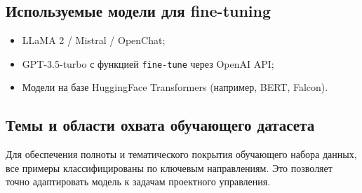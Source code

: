 \documentclass[12pt]{article}
\begin{document}
\subsection{Используемые модели для fine-tuning}

\begin{itemize}
    \item LLaMA 2 / Mistral / OpenChat;
    \item GPT-3.5-turbo с функцией \texttt{fine-tune} через OpenAI API;
    \item Модели на базе HuggingFace Transformers (например, BERT, Falcon).
\end{itemize}
\subsection{Темы и области охвата обучающего датасета}

Для обеспечения полноты и тематического покрытия обучающего набора данных, все примеры классифицированы по ключевым направлениям. Это позволяет точно адаптировать модель к задачам проектного управления.
\end{document}
